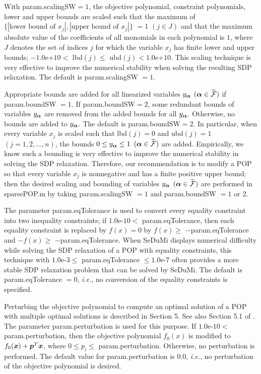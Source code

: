 With {\sf param.scalingSW}$=1$, the objective polynomial,
constraint polynomials, lower and upper bounds are
 scaled such that the maximum of $\{ |\mbox{lower bound of $x_j$}|,
 | \mbox{upper bound of $x_j$} | \} $ $= 1$ $(j \in J)$
 and that the maximum absolute value of the coefficients of all monomials in each
 polynomial is $1$, where $J$ denotes the set of indices $j$ for which
 the variable $x_j$ has finite lower and upper bounds;
 $-1.0$e+$10 < $ lbd$(j) \leq $ ubd$(j) < 1.0$e+$10$.
This scaling technique is very effective to improve the numerical stability
when solving the resulting SDP relaxation. The default is  {\sf param.scalingSW}  $=1$.

Appropriate bounds are added  for all linearized
variables $y_{\salpha}$ $(\balpha \in \widetilde{\FC})$ if {\sf param.boundSW} $= 1$.
If {\sf param.boundSW}$=2$, some redundant bounds of variables $y_{\salpha}$ are
removed from the added  bounds for all $y_{\salpha}$. Otherwise, no
bounds are added to $y_{\salpha}$. The default is  {\sf param.boundSW}$= 2$.
In particular, when every variable $x_j$
is scaled such that lbd$(j) = 0$ and
ubd$(j)=1$ $(j=1,2,\ldots,n)$, the bounds
$0 \leq y_{\salpha} \leq 1$ $(\balpha \in \widetilde{\FC})$
are added. Empirically, we know such a bounding is very effective to improve
the numerical stability in solving the SDP relaxation. Therefore,
our recommendation is to
modify a POP so that every variable $x_j$ is nonnegative and
has a finite positive upper bound; then the desired scaling and bounding of
variables $y_{\salpha}$ $(\balpha \in \widetilde{\FC})$ are performed in
 sparsePOP.m by taking {\sf param.scalingSW} $=1$
and {\sf param.boundSW} $= 1 \mbox{ or } 2$.

The parameter {\sf param.eqTolerance} is used to
convert  every equality constraint into two inequality constraints;
if $1.0$e-$10 < $ {\sf param.eqTolerance},
then  each equality constraint is replaced by
$f(x) = 0$ by $ f(x) \geq$ {\sf $-$param.eqTolerance}  and $ -f(x) \geq$ {\sf $-$param.eqTolerance}.
When SeDuMi displays  numerical difficulty while solving
the SDP relaxation of a POP with equality constraints,
this technique with $1.0$e-$3 \leq $ {\sf param.eqTolerance} $\leq 1.0$e-$7$
often provides a more stable SDP relaxation problem that can be solved by
SeDuMi. The default is {\sf param.eqTolerance} $=0$, {\it i.e.},
no conversion of the equality constraints is specified.

Perturbing the objective polynomial to compute an optimal
solution of a POP with multiple optimal solutions is described in
Section 5. See also Section 5.1 of \cite{WAKI04}.
The parameter {\sf param.perturbation} is used for this purpose.
If $1.0$e-$10 < $ {\sf param.perturbation}, then
the objective polynomial $f_0(x)$ is modified to  $f_0(\x) + \p^T \x$,
where $0 \leq p_i \leq$ {\sf param.perturbation}. Otherwise,
no perturbation is performed. The default value for {\sf param.perturbation} is $0.0$, {\it i.e.},
no perturbation of the objective polynomial is desired.

